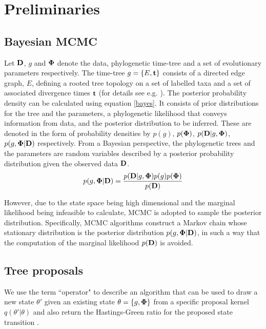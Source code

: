 \documentclass{bmcart}
\begin{document}
\section*{Preliminaries}
\subsection*{Bayesian MCMC}
Let $\bf{D}$, $g$ and $\bf{\Phi}$ denote the data, phylogenetic time-tree and a set of evolutionary parameters respectively.
The time-tree $g = \{E,\bf{t}\}$ consists of a directed edge graph, $E$, defining a rooted tree topology on a set of labelled taxa and a set of associated divergence times $\bf{t}$ (for details see e.g. \cite{drummond2002estimatingdata}).
 The posterior probability density can be calculated using equation \ref{bayes}. It consists of prior distributions for the  tree and the parameters, a phylogenetic likelihood that conveys information from data, and the posterior distribution to be inferred. These are denoted in the form of probability densities by $p(g) $, $p(\bf{\Phi})$, $p({\bf{D}}|g,\bf{\Phi} )$, $p(g,{\bf{\Phi}}|{\bf{D}})$ respectively. From a Bayesian perspective, the phylogenetic trees and the parameters are random variables described by a posterior probability distribution given the observed data ${\bf{D}}$.
\begin{equation}\label{bayes}
p(g,{\bf{\Phi}} |{\bf{D}}) = \frac{{p ({\bf{D}}|g,{\bf{\Phi}} ) p (g) p ({\bf{\Phi}} )}}{{p (\bf{D})}}
\end{equation}

However, due to the state space being high dimensional and the marginal likelihood being infeasible to calculate, MCMC is adopted to sample the posterior distribution. Specifically, MCMC algorithms construct a Markov chain whose stationary distribution is the posterior distribution $p(g,{\bf{\Phi}} |{\bf{D}})$, in such a way that the computation of the marginal likelihood $p ({\bf{D}})$ is avoided.
\subsection*{Tree proposals}
\label{treeproposals}
We use the term ``operator" to describe an algorithm that can be used to draw a new state $\theta'$ given an existing state $\theta = \{g,{\bf{\Phi}}\}$ from a specific proposal kernel $q(\theta'|\theta)$ and also return the Hastings-Green ratio for the proposed state transition \cite{hastings1970monte,green1995reversible}.
\end{document}
